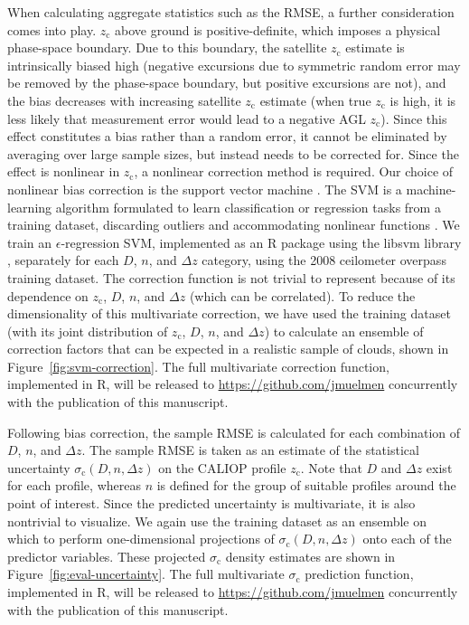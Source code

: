 \documentclass[essd,manuscript]{copernicus}
\begin{document}
When calculating aggregate statistics such as the RMSE, a further consideration
comes into play.  \ensuremath{z_\text{c}}{} above ground is positive-definite, which imposes a
physical phase-space boundary.  Due to this boundary, the satellite \ensuremath{z_\text{c}}{}
estimate is intrinsically biased high (negative excursions due to symmetric
random error may be removed by the phase-space boundary, but positive excursions
are not), and the bias decreases with increasing satellite \ensuremath{z_\text{c}}{} estimate
(when true \ensuremath{z_\text{c}}{} is high, it is less likely that measurement error would lead
to a negative AGL \ensuremath{z_\text{c}}{}).  Since this effect constitutes a bias rather than a
random error, it cannot be eliminated by averaging over large sample sizes, but
instead needs to be corrected for.  Since the effect is nonlinear in \ensuremath{z_\text{c}}{}, a
nonlinear correction method is required.  Our choice of nonlinear bias
correction is the support vector machine \citep[SVM;][]{Cortes1995}.  The SVM is
a machine-learning algorithm formulated to learn classification
\citep{Cortes1995} or regression \citep{Vapnik1995} tasks from a training
dataset, discarding outliers and accommodating nonlinear functions
\citep[e.g.,][]{Smola2004}.  We train an $\epsilon$-regression SVM, implemented
as an R package \citep{e1071} using the libsvm library \citep{svm}, separately
for each $D$, $n$, and $\Delta z$ category, using the 2008 ceilometer overpass
training dataset.  The correction function is not trivial to represent because
of its dependence on $z_\text{c}$, $D$, $n$, and $\Delta z$ (which can be
correlated).  To reduce the dimensionality of this multivariate correction, we
have used the training dataset (with its joint distribution of $z_\text{c}$,
$D$, $n$, and $\Delta z$) to calculate an ensemble of correction factors that
can be expected in a realistic sample of clouds, shown in
Figure~\ref{fig:svm-correction}.  The full multivariate correction function,
implemented in R, will be released to \url{https://github.com/jmuelmen}
concurrently with the publication of this manuscript.

Following bias correction, the sample RMSE is calculated for each combination of
$D$, $n$, and $\Delta z$.  The sample RMSE is taken as an estimate of the
statistical uncertainty $\ensuremath{\sigma_\text{c}}(D,n,\Delta z)$ on the CALIOP profile \ensuremath{z_\text{c}}{}.
Note that $D$ and $\Delta z$ exist for each profile, whereas $n$ is defined for
the group of suitable profiles around the point of interest.  Since the
predicted uncertainty is multivariate, it is also nontrivial to visualize.  We
again use the training dataset as an ensemble on which to perform
one-dimensional projections of $\ensuremath{\sigma_\text{c}}(D,n,\Delta z)$ onto each of the
predictor variables.  These projected $\ensuremath{\sigma_\text{c}}$ density estimates are shown in
Figure~\ref{fig:eval-uncertainty}.  The full multivariate $\ensuremath{\sigma_\text{c}}$ prediction
function, implemented in R, will be released to
\url{https://github.com/jmuelmen} concurrently with the publication of this
manuscript.
\end{document}
